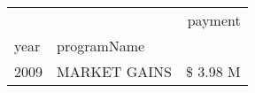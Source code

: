 \begin{tabular}{llr}
\toprule
 &  & payment \\
year & programName &  \\
\midrule
2009 & MARKET GAINS & \$ 3.98 M \\
\cline{1-3}
\bottomrule
\end{tabular}
